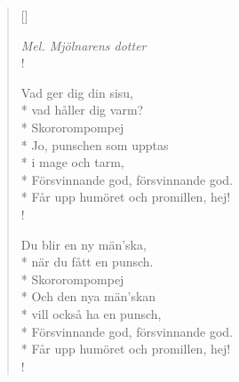 
\settowidth{\versewidth}{Försvinnande god, försvinnande god.}



\begin{verse}[\versewidth]

\flagverse{}
\emph{Mel. Mjölnarens dotter}\\!


Vad ger dig din sisu,\\*
vad håller dig varm?\\*
Skororompompej\\*
Jo, punschen som upptas\\*
i mage och tarm,\\*
Försvinnande god, försvinnande god.\\*
Får upp humöret och promillen, hej!\\!

Du blir en ny män'ska,\\*
när du fått en punsch.\\*
Skororompompej\\*
Och den nya män'skan\\*
vill också ha en punsch,\\*
Försvinnande god, försvinnande god.\\*
Får upp humöret och promillen, hej!\\!




\end{verse}

